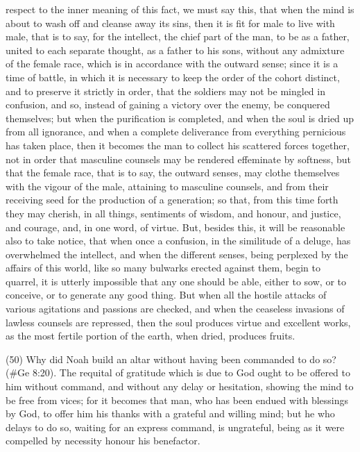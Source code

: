 respect to the inner meaning of this fact, we must say this, that when the mind is about to wash off
and cleanse away its sins, then it is fit for male to live with male, that is to say, for the intellect, the
chief part of the man, to be as a father, united to each separate thought, as a father to his sons,
without any admixture of the female race, which is in accordance with the outward sense; since it is
a time of battle, in which it is necessary to keep the order of the cohort distinct, and to preserve it
strictly in order, that the soldiers may not be mingled in confusion, and so, instead of gaining a
victory over the enemy, be conquered themselves; but when the purification is completed, and
when the soul is dried up from all ignorance, and when a complete deliverance from everything
pernicious has taken place, then it becomes the man to collect his scattered forces together, not in
order that masculine counsels may be rendered effeminate by softness, but that the female race,
that is to say, the outward senses, may clothe themselves with the vigour of the male, attaining to
masculine counsels, and from their receiving seed for the production of a generation; so that, from
this time forth they may cherish, in all things, sentiments of wisdom, and honour, and justice, and
courage, and, in one word, of virtue. But, besides this, it will be reasonable also to take notice, that
when once a confusion, in the similitude of a deluge, has overwhelmed the intellect, and when the
different senses, being perplexed by the affairs of this world, like so many bulwarks erected
against them, begin to quarrel, it is utterly impossible that any one should be able, either to sow, or
to conceive, or to generate any good thing. But when all the hostile attacks of various agitations
and passions are checked, and when the ceaseless invasions of lawless counsels are repressed,
then the soul produces virtue and excellent works, as the most fertile portion of the earth, when
dried, produces fruits.

(50) Why did Noah build an altar without having been commanded to do so? (\#Ge 8:20). The
requital of gratitude which is due to God ought to be offered to him without command, and without
any delay or hesitation, showing the mind to be free from vices; for it becomes that man, who has
been endued with blessings by God, to offer him his thanks with a grateful and willing mind; but he
who delays to do so, waiting for an express command, is ungrateful, being as it were compelled by
necessity honour his benefactor.

